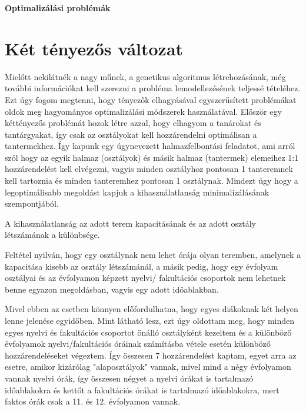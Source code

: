 \documentclass[a4paper,12pt]{article}
\begin{document}
\begin{center}
    \huge \textbf{Optimalizálási problémák} 
\end{center}

\section{Két tényezős változat}

Mielőtt nekilátnék a nagy műnek, a genetikus algoritmus létrehozásának, még további
információkat kell szerezni a probléma lemodellezésének teljessé tételéhez. Ezt úgy fogom
megtenni, hogy tényezők elhagyásával egyszerűsített problémákat oldok meg hagyományos
optimalizálási módszerek használatával. Először egy kéttényezős problémát hozok létre azzal,
hogy elhagyom a tanárokat és tantárgyakat, így csak az osztályokat kell hozzárendelni
optimálisan a tantermekhez. Így kapunk egy úgynevezett halmazfelbontási feladatot, ami arról
szól hogy az egyik halmaz (osztályok) és másik halmaz (tantermek) elemeihez 1:1
hozzárendelést kell elvégezni, vagyis minden osztályhoz pontosan 1 tanteremnek kell tartoznia
és minden tanteremhez pontosan 1 osztálynak.
Mindezt úgy hogy a legoptimálisabb megoldást
kapjuk a kihasználatlanság minimalizálásának szempontjából.

A kihasználatlanság az adott
terem kapacitásának és az adott osztály létszámának a különbsége.

Feltétel nyilván, hogy egy
osztálynak nem lehet órája olyan teremben, amelynek a kapacitása kisebb az osztály
létszámánál, a másik pedig, hogy egy évfolyam osztályai és az évfolyamon képzett nyelvi/
fakultációs csoportok nem lehetnek benne egyazon megoldásban, vagyis egy adott időablakban.

Mivel ebben az esetben könnyen előfordulhatna, hogy egyes diákoknak két helyen lenne jelenése
egyidőben. Mint látható lesz, ezt úgy oldottam meg, hogy minden egyes nyelvi és fakultációs
csoportot önálló osztályként kezeltem és a különböző évfolyamok nyelvi/fakultációs óráinak
számításba vétele esetén különböző hozzárendeléseket végeztem. Így összesen 7 hozzárendelést
kaptam, egyet arra az esetre, amikor kizárólag "alaposztályok" vannak, mivel mind a négy
évfolyamon vannak nyelvi órák, így összesen négyet a nyelvi órákat is tartalmazó
időablakokra és kettőt a fakultációs órákat is tartalmazó időablakokra, mert faktos órák
csak a 11. és 12. évfolyamon vannak. 

\end{document}
